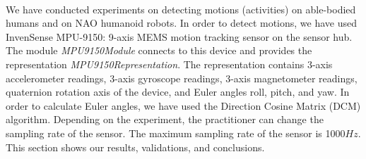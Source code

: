 \documentclass[letterpaper]{article}
\begin{document}
\begin{figure}[!t]
\centering
{} 
\caption{~}
 \label{fig:human}
\end{figure}


We have conducted experiments on detecting motions (activities) on able-bodied humans and on NAO
humanoid robots. In order to detect motions, we have used InvenSense MPU-9150: 9-axis MEMS
motion tracking sensor on the sensor hub. The module {\em MPU9150Module} connects to this device
and provides the representation {\em MPU9150Representation}. The representation contains
3-axis accelerometer readings, 3-axis gyroscope readings, 3-axis magnetometer readings, quaternion
rotation axis of the device, and Euler angles roll, pitch, and yaw.  In order to calculate Euler
angles, we have used the Direction Cosine Matrix (DCM)
algorithm.  Depending on the
experiment, the practitioner can change the sampling rate of the sensor.  The maximum sampling rate
of the sensor is 1000$Hz$. This section shows our results, validations, and conclusions.
\end{document}
